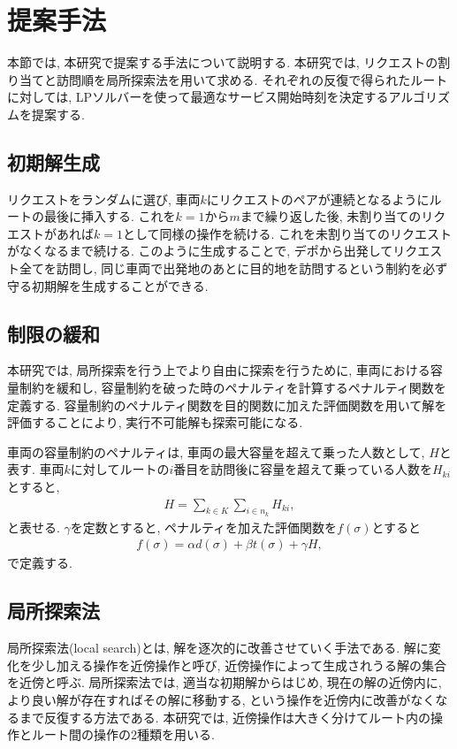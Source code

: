 \chapter{提案手法}\label{method}
本節では, 本研究で提案する手法について説明する. 本研究では, リクエストの割り当てと訪問順を局所探索法を用いて求める. それぞれの反復で得られたルートに対しては, LPソルバーを使って最適なサービス開始時刻を決定するアルゴリズムを提案する.
\section{初期解生成}
リクエストをランダムに選び, 車両$k$にリクエストのペアが連続となるようにルートの最後に挿入する. これを$k = 1 から m$まで繰り返した後, 未割り当てのリクエストがあれば$k = 1 $として同様の操作を続ける. これを未割り当てのリクエストがなくなるまで続ける.
このように生成することで, デポから出発してリクエスト全てを訪問し, 同じ車両で出発地のあとに目的地を訪問するという制約を必ず守る初期解を生成することができる.

\section{制限の緩和}
本研究では, 局所探索を行う上でより自由に探索を行うために, 車両における容量制約を緩和し, 容量制約を破った時のペナルティを計算するペナルティ関数を定義する. 容量制約のペナルティ関数を目的関数に加えた評価関数を用いて解を評価することにより, 実行不可能解も探索可能になる.

車両の容量制約のペナルティは, 車両の最大容量を超えて乗った人数として, $H$と表す. 車両$k$に対してルートの$i$番目を訪問後に容量を超えて乗っている人数を$H_{ki}$とすると,
\begin{align*}
  H = \sum_{k \in K}\sum_{i \in n_k} H_{ki},
\end{align*}
と表せる.
$\gamma$を定数とすると, ペナルティを加えた評価関数を$f(\sigma)$とすると
\begin{align*}
  f(\sigma) = \alpha d(\sigma)+ \beta t(\sigma) + \gamma H,
\end{align*}
で定義する.

\section{局所探索法}
局所探索法(local search)とは, 解を逐次的に改善させていく手法である. 解に変化を少し加える操作を近傍操作と呼び, 近傍操作によって生成されうる解の集合を近傍と呼ぶ. 局所探索法では, 適当な初期解からはじめ, 現在の解の近傍内に, より良い解が存在すればその解に移動する, という操作を近傍内に改善がなくなるまで反復する方法である. 本研究では, 近傍操作は大きく分けてルート内の操作とルート間の操作の2種類を用いる.


